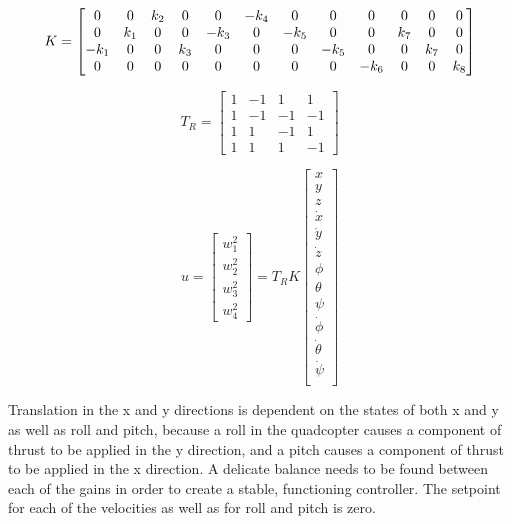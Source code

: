 \documentclass[letterpaper,12pt,titlepage,oneside,final]{book}
\begin{document}
\begin{equation} \label{eq:gain_matrix}
K =
\setcounter{MaxMatrixCols}{12}
\begin{bmatrix}
0 & 0 & k_{2} & 0 & 0 & -k_{4} & 0 & 0 & 0 & 0 & 0 & 0 \\
0 & k_{1} & 0 & 0 & -k_{3} & 0 & -k_{5} & 0 & 0 & k_{7} & 0 & 0 \\
-k_{1} & 0 & 0 & k_{3} & 0 & 0 & 0 & -k_{5} & 0 & 0 & k_{7} & 0 \\
0 & 0 & 0 & 0 & 0 & 0 & 0 & 0 & -k_{6} & 0 & 0 & k_{8}
\end{bmatrix}
\end{equation}

\begin{equation} \label{eq:rotor_transform}
T_{R} = 
\begin{bmatrix}
1 & -1 & 1 & 1 \\
1 & -1 & -1 & -1 \\
1 & 1 & -1 & 1 \\
1 & 1 & 1 & -1
\end{bmatrix}
\end{equation}

\begin{equation} \label{eq:control_equation}
u = 
\begin{bmatrix}
w_{1}^{2} \\
w_{2}^{2} \\
w_{3}^{2} \\
w_{4}^{2}
\end{bmatrix}
= T_{R}K
\begin{bmatrix}
x \\
y \\
z \\
\dot{x} \\
\dot{y} \\
\dot{z} \\
\phi \\
\theta \\
\psi \\
\dot{\phi} \\
\dot{\theta} \\
\dot{\psi} \\
\end{bmatrix}
\end{equation}

Translation in the x and y directions is dependent on the states of both x and y as well as roll and pitch, because a roll in the quadcopter causes a component of thrust to be applied in the y direction, and a pitch causes a component of thrust to be applied in the x direction.
A delicate balance needs to be found between each of the gains in order to create a stable, functioning controller. 
The setpoint for each of the velocities as well as for roll and pitch is zero.
\end{document}
